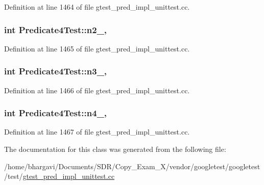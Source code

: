 Definition at line 1464 of file gtest\+\_\+pred\+\_\+impl\+\_\+unittest.\+cc.

\subsubsection[{\texorpdfstring{n2\+\_\+}{n2_}}]{\setlength{\rightskip}{0pt plus 5cm}int Predicate4\+Test\+::n2\+\_\+\hspace{0.3cm}{\ttfamily [static]}, {\ttfamily [protected]}}\hypertarget{class_predicate4_test_a088fce743c747e3851c926cb3a87fda3}{}\label{class_predicate4_test_a088fce743c747e3851c926cb3a87fda3}


Definition at line 1465 of file gtest\+\_\+pred\+\_\+impl\+\_\+unittest.\+cc.

\subsubsection[{\texorpdfstring{n3\+\_\+}{n3_}}]{\setlength{\rightskip}{0pt plus 5cm}int Predicate4\+Test\+::n3\+\_\+\hspace{0.3cm}{\ttfamily [static]}, {\ttfamily [protected]}}\hypertarget{class_predicate4_test_a00ae6ae54c7d6639d448c036aedb6114}{}\label{class_predicate4_test_a00ae6ae54c7d6639d448c036aedb6114}


Definition at line 1466 of file gtest\+\_\+pred\+\_\+impl\+\_\+unittest.\+cc.

\subsubsection[{\texorpdfstring{n4\+\_\+}{n4_}}]{\setlength{\rightskip}{0pt plus 5cm}int Predicate4\+Test\+::n4\+\_\+\hspace{0.3cm}{\ttfamily [static]}, {\ttfamily [protected]}}\hypertarget{class_predicate4_test_ae42e23ce11e3f1c6b813496d6180cc67}{}\label{class_predicate4_test_ae42e23ce11e3f1c6b813496d6180cc67}


Definition at line 1467 of file gtest\+\_\+pred\+\_\+impl\+\_\+unittest.\+cc.



The documentation for this class was generated from the following file\+:\begin{DoxyCompactItemize}
\item 
/home/bhargavi/\+Documents/\+S\+D\+R/\+Copy\+\_\+\+Exam\+\_\+X/vendor/googletest/googletest/test/\hyperlink{gtest__pred__impl__unittest_8cc}{gtest\+\_\+pred\+\_\+impl\+\_\+unittest.\+cc}\end{DoxyCompactItemize}
